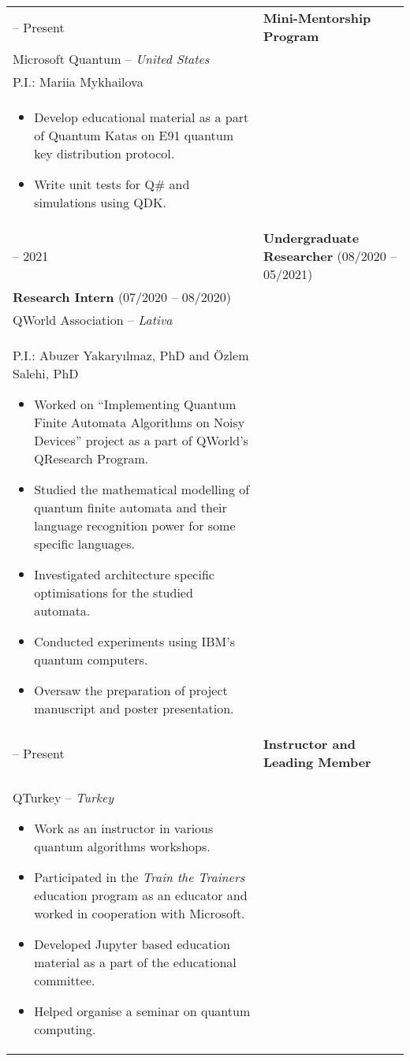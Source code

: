 \documentclass[11pt]{article} %
\makeatletter
\newlength{\firstColumnWidth}
\newlength{\tabusep}
\newenvironment{twocols}
    {
    \begin{longtable}[h]{%
        @{}%
        >{\raggedleft}p{\firstColumnWidth}%
        @{\hspace{\tabusep}}%
        >{\arraybackslash\raggedright}p{\dimexpr %
            \linewidth-\firstColumnWidth-\tabusep%
        \relax}%
        @{}%
        }
    } {
        \end{longtable}
    }
\makeatother
\begin{document}
\begin{twocols}
  2021 -- Present & 
    \textbf{Mini-Mentorship Program} \\
    Microsoft Quantum -- \textit{United States} \\
    P.I.: Mariia Mykhailova \\
    \begin{itemize}
      \item Develop educational material as a part of Quantum Katas on E91 quantum key distribution protocol.
      \item Write unit tests for Q\# and simulations using QDK. 
    \end{itemize} \tabularnewline
  2020 -- 2021 & 
    \textbf{Undergraduate Researcher} (08/2020 -- 05/2021)\\
    \textbf{Research Intern} (07/2020 -- 08/2020)\\
    QWorld Association -- \textit{Lativa}\\
    P.I.: Abuzer Yakaryılmaz, PhD and Özlem Salehi, PhD
    \begin{itemize}
        \item Worked on “Implementing Quantum Finite Automata Algorithms on Noisy Devices” project as a part of QWorld's QResearch Program.
        \item Studied the mathematical modelling of quantum finite automata and their language recognition power for some specific languages.
        \item Investigated architecture specific optimisations for the studied automata.
        \item Conducted experiments using IBM's quantum computers.
        \item Oversaw the preparation of project manuscript and poster presentation.
    \end{itemize} \tabularnewline
    2019 -- Present & 
    \textbf{Instructor and Leading Member} \\
    QTurkey -- \textit{Turkey}
    \begin{itemize}
        \item Work as an instructor in various quantum algorithms workshops.
        \item Participated in the \emph{Train the Trainers} education program as an educator and worked in cooperation with Microsoft.
        \item Developed Jupyter based education material as a part of the educational committee.
        \item Helped organise a seminar on quantum computing.
    \end{itemize}
\end{twocols}
\end{document}
